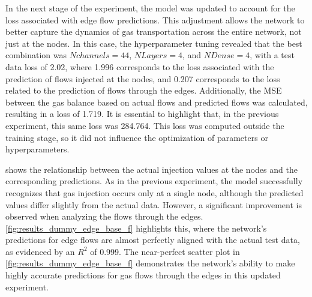 


In the next stage of the experiment, the model was updated to account for the loss associated with edge flow predictions. This adjustment allows the network to better capture the dynamics of gas transportation across the entire network, not just at the nodes. In this case, the hyperparameter tuning revealed that the best combination was $N channels=44$, $N Layers=4$, and $N Dense=4$, with a test data loss of 2.02, where 1.996 corresponds to the loss associated with the prediction of flows injected at the nodes, and 0.207 corresponds to the loss related to the prediction of flows through the edges. Additionally, the MSE between the gas balance based on actual flows and predicted flows was calculated, resulting in a loss of 1.719. It is essential to highlight that, in the previous experiment, this same loss was 284.764. This loss was computed outside the training stage, so it did not influence the optimization of parameters or hyperparameters.


 shows the relationship between the actual injection values at the nodes and the corresponding predictions. As in the previous experiment, the model successfully recognizes that gas injection occurs only at a single node, although the predicted values differ slightly from the actual data. However, a significant improvement is observed when analyzing the flows through the edges. \cref{fig:results_dummy_edge_base_f} highlights this, where the network's predictions for edge flows are almost perfectly aligned with the actual test data, as evidenced by an $R^2$ of 0.999. The near-perfect scatter plot in \cref{fig:results_dummy_edge_base_f} demonstrates the network's ability to make highly accurate predictions for gas flows through the edges in this updated experiment.



\begin{figure}
    \centering
        \setlength{}        
        \setlength{} 
    \label{fig:dummy_base_f_results}
\end{figure}


